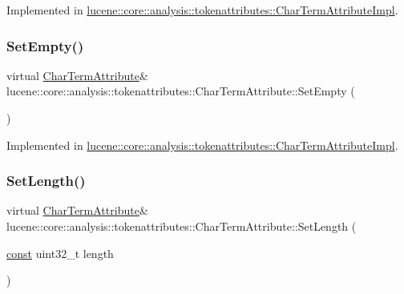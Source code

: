 Implemented in \mbox{\hyperlink{classlucene_1_1core_1_1analysis_1_1tokenattributes_1_1CharTermAttributeImpl_abc195e8927e23632d34d4c081ede76b4}{lucene\+::core\+::analysis\+::tokenattributes\+::\+Char\+Term\+Attribute\+Impl}}.

\mbox{\label{classlucene_1_1core_1_1analysis_1_1tokenattributes_1_1CharTermAttribute_ac14e6e064418d1d56b0f33724dcfe8b0}} 
\subsubsection{\texorpdfstring{Set\+Empty()}{SetEmpty()}}
{\footnotesize\ttfamily virtual \mbox{\hyperlink{classlucene_1_1core_1_1analysis_1_1tokenattributes_1_1CharTermAttribute}{Char\+Term\+Attribute}}\& lucene\+::core\+::analysis\+::tokenattributes\+::\+Char\+Term\+Attribute\+::\+Set\+Empty (\begin{DoxyParamCaption}{ }\end{DoxyParamCaption})\hspace{0.3cm}{\ttfamily [pure virtual]}}



Implemented in \mbox{\hyperlink{classlucene_1_1core_1_1analysis_1_1tokenattributes_1_1CharTermAttributeImpl_a328d66d5bfd40a9bcd91ffe59933bc15}{lucene\+::core\+::analysis\+::tokenattributes\+::\+Char\+Term\+Attribute\+Impl}}.

\mbox{\label{classlucene_1_1core_1_1analysis_1_1tokenattributes_1_1CharTermAttribute_a8186262029561e196e991fc543cd9953}} 
\subsubsection{\texorpdfstring{Set\+Length()}{SetLength()}}
{\footnotesize\ttfamily virtual \mbox{\hyperlink{classlucene_1_1core_1_1analysis_1_1tokenattributes_1_1CharTermAttribute}{Char\+Term\+Attribute}}\& lucene\+::core\+::analysis\+::tokenattributes\+::\+Char\+Term\+Attribute\+::\+Set\+Length (\begin{DoxyParamCaption}\item[{\mbox{\hyperlink{ZlibCrc32_8h_a2c212835823e3c54a8ab6d95c652660e}{const}} uint32\+\_\+t}]{length }\end{DoxyParamCaption})\hspace{0.3cm}{\ttfamily [pure virtual]}}



